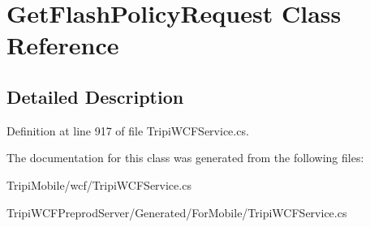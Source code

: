 \hypertarget{class_get_flash_policy_request}{
\section{GetFlashPolicyRequest Class Reference}
\label{class_get_flash_policy_request}
}


\subsection{Detailed Description}


Definition at line 917 of file TripiWCFService.cs.

The documentation for this class was generated from the following files:\begin{DoxyCompactItemize}
\item 
TripiMobile/wcf/TripiWCFService.cs\item 
TripiWCFPreprodServer/Generated/ForMobile/TripiWCFService.cs\end{DoxyCompactItemize}
